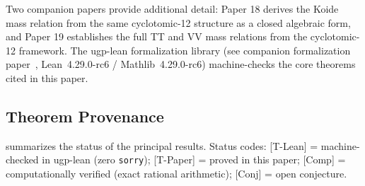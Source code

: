 \documentclass[11pt,twocolumn]{article}
\begin{document}
Two companion papers provide additional detail: Paper 18 \cite{Spivack2026_Koide} derives the Koide mass relation from the same cyclotomic-12 structure as a closed algebraic form, and Paper 19 \cite{Spivack2026_CyclotomicMass} establishes the full TT and VV mass relations from the cyclotomic-12 framework. The ugp-lean formalization library \cite{ugp-lean} (see companion formalization paper~\cite{SpivackUGPFormalization}, Lean~4.29.0-rc6 / Mathlib~4.29.0-rc6) machine-checks the core theorems cited in this paper.

\subsection{Theorem Provenance}

 summarizes the status of the principal results. Status codes: [T-Lean] = machine-checked in ugp-lean (zero \texttt{sorry}); [T-Paper] = proved in this paper; [Comp] = computationally verified (exact rational arithmetic); [Conj] = open conjecture.
\end{document}
